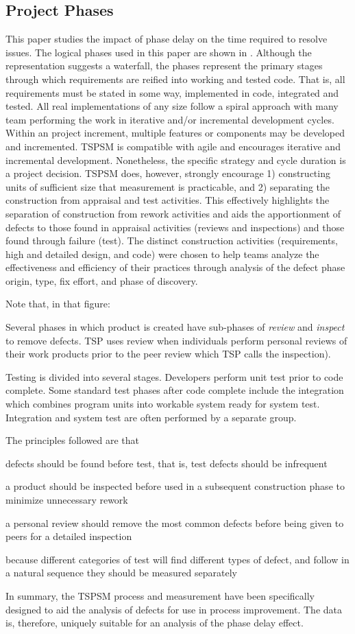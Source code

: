 \subsection{Project Phases}
This paper studies the impact of phase delay on the time required to resolve issues.
The logical phases used in this paper are shown in . Although the representation suggests a waterfall, the phases represent the primary stages through which requirements are reified into working and tested code. That is, all requirements must be stated in some way, implemented in code, integrated and tested. All real implementations of any size follow a spiral approach with many team performing the work in iterative and/or incremental development cycles.  Within an project increment, multiple features or components may be developed and incremented. TSPSM is compatible with agile and encourages iterative and incremental development. Nonetheless, the specific strategy and cycle duration is a project decision. TSPSM does, however, strongly encourage 1) constructing units of sufficient size that measurement is practicable, and 2) separating the construction from appraisal and test activities. This effectively highlights the separation of construction from rework activities and aids the apportionment of defects to those found in appraisal activities (reviews and inspections) and those found through failure (test). The distinct construction activities (requirements, high and detailed design, and code) were chosen to help teams analyze the effectiveness and efficiency of their practices through analysis of the defect phase origin, type, fix effort, and phase of discovery. 

Note that, in that figure:
\bi 
\item
Several  phases in which product is created have sub-phases of {\em review} and {\em inspect} to remove defects. TSP uses review when individuals perform personal reviews of their work products prior to the peer review which TSP calls the inspection).
\item Testing is divided into several stages. Developers perform unit test prior to code complete. Some standard test phases after code complete include the integration which combines program units into workable system ready for system test. Integration and system test are often performed by a separate group.
\ei

The principles followed are that 
\bi 
\item defects should be found before test, that is, test defects should be infrequent
\item a product should be inspected before used in a subsequent construction phase to minimize  unnecessary rework
\item a personal review should remove the most common defects before being given to peers for a detailed inspection
\item because different categories of test will find different types of defect, and follow in a natural sequence they should be measured separately
\ei 

In summary, the TSPSM process and measurement have been specifically designed to aid the analysis of defects for use in process improvement. The data is, therefore, uniquely suitable for an analysis of the phase delay effect. 